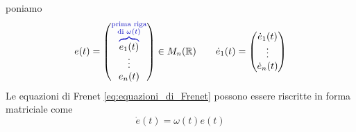 \begin{definizione}
        poniamo 
        \[ e(t) = \begin{pmatrix} \textcolor{blu}{\overbrace{\textcolor{black}{e_1(t)}}^{\substack{\text{prima riga} \\ \text{di } \omega(t)}}} \\ \vdots \\ e_n(t) \end{pmatrix} \in M_{n} (\mathbb{R}) 
        \qquad \dot{e}_1(t) = \begin{pmatrix} \dot{e}_1(t) \\ \vdots \\ \dot{e}_n(t) \end{pmatrix} \]
        Le equazioni di Frenet \eqref{eq:equazioni_di_Frenet} possono essere riscritte in forma matriciale come
        \begin{equation}
        \label{eq:equazioni_di_Frenet_matriciale}
        \dot{e}(t) = \omega(t) e(t)
        \end{equation}
        \end{definizione}
        \newpage
